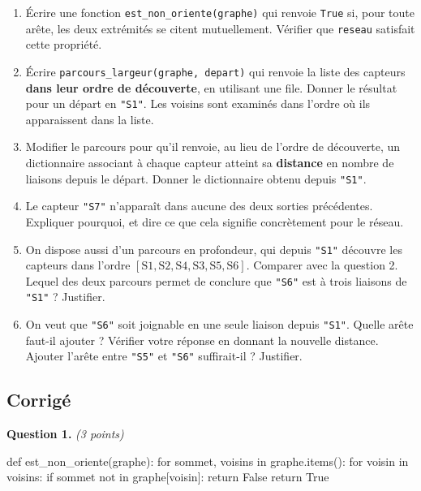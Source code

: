 \begin{enumerate}
  \item Écrire une fonction \lstinline{est_non_oriente(graphe)} qui renvoie
    \lstinline{True} si, pour toute arête, les deux extrémités se citent
    mutuellement. Vérifier que \lstinline{reseau} satisfait cette propriété.

  \item Écrire \lstinline{parcours_largeur(graphe, depart)} qui renvoie la
    liste des capteurs \textbf{dans leur ordre de découverte}, en utilisant une
    file. Donner le résultat pour un départ en \lstinline{"S1"}. Les voisins
    sont examinés dans l'ordre où ils apparaissent dans la liste.

  \item Modifier le parcours pour qu'il renvoie, au lieu de l'ordre de
    découverte, un dictionnaire associant à chaque capteur atteint sa
    \textbf{distance} en nombre de liaisons depuis le départ. Donner le
    dictionnaire obtenu depuis \lstinline{"S1"}.

  \item Le capteur \lstinline{"S7"} n'apparaît dans aucune des deux sorties
    précédentes. Expliquer pourquoi, et dire ce que cela signifie
    concrètement pour le réseau.

  \item On dispose aussi d'un parcours en profondeur, qui depuis
    \lstinline{"S1"} découvre les capteurs dans l'ordre
    $[\text{S1}, \text{S2}, \text{S4}, \text{S3}, \text{S5}, \text{S6}]$.
    Comparer avec la question 2. Lequel des deux parcours permet de conclure
    que \lstinline{"S6"} est à trois liaisons de \lstinline{"S1"} ? Justifier.

  \item On veut que \lstinline{"S6"} soit joignable en une seule liaison depuis
    \lstinline{"S1"}. Quelle arête faut-il ajouter ? Vérifier votre réponse en
    donnant la nouvelle distance. Ajouter l'arête entre \lstinline{"S5"} et
    \lstinline{"S6"} suffirait-il ? Justifier.
\end{enumerate}

\subsection*{Corrigé}

\textbf{Question 1.} \emph{(3 points)}

\begin{python}
def est_non_oriente(graphe):
    for sommet, voisins in graphe.items():
        for voisin in voisins:
            if sommet not in graphe[voisin]:
                return False
    return True
\end{python}

